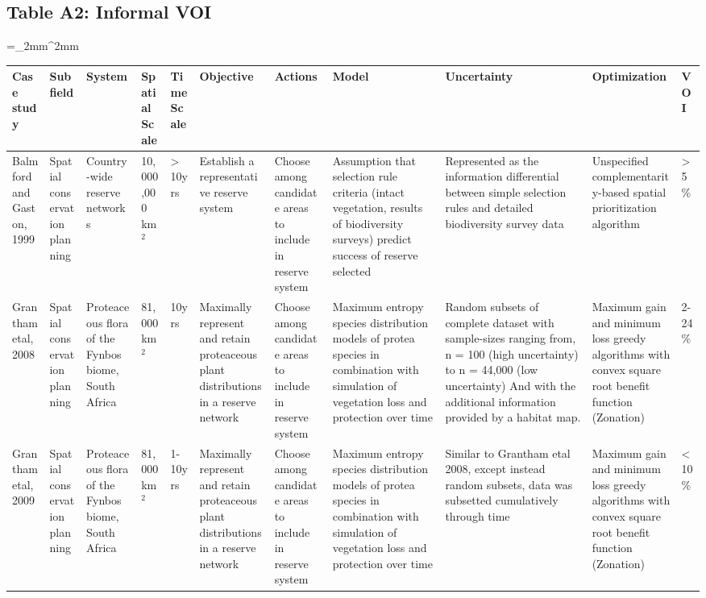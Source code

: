 \begin{landscape}
\subsection*{Table A2: Informal VOI}
\bgroup
\linespread{1}\scriptsize
\extrarowsep=_2mm^2mm
\begin{longtabu} to 230mm {|X[1,l] X[1,l] X[1,l] X[1,l] X[.8,l] X[1,l] X[1,l] X[1,l] X[1,l] X[1,l] X[.5,l]|} \hline 
Case study & Subfield & System & Spatial Scale & Time Scale & Objective & Actions & Model & Uncertainty & Optimization & VOI \\ \hline
Balmford and Gaston, 1999 & Spatial conservation planning & Country-wide reserve networks & 10,000,000 km$^2$ & > 10yrs & Establish a representative reserve system & Choose among candidate areas to include in reserve system & Assumption that selection rule criteria (intact vegetation, results of biodiversity surveys) predict success of reserve selected  & Represented as the information differential between simple selection rules and detailed biodiversity survey data & Unspecified complementarity-based spatial prioritization algorithm & >5\% \\ 
Grantham etal, 2008 & Spatial conservation planning & Proteaceous flora of the Fynbos biome, South Africa  & 81,000 km$^2$ & 10yrs & Maximally represent and retain proteaceous plant distributions in a reserve network & Choose among candidate areas to include in reserve system & Maximum entropy species distribution models of protea species in combination with simulation of vegetation loss and protection over time & Random subsets of complete dataset with sample-sizes ranging from, n = 100 (high uncertainty) to n = 44,000 (low uncertainty) And with the additional information provided by a habitat map. & Maximum gain and minimum loss greedy algorithms with convex square root benefit function (Zonation) & 2-24\% \\ 
Grantham etal, 2009 & Spatial conservation planning & Proteaceous flora of the Fynbos biome, South Africa  & 81,000 km$^2$ & 1-10yrs & Maximally represent and retain proteaceous plant distributions in a reserve network & Choose among candidate areas to include in reserve system & Maximum entropy species distribution models of protea species in combination with simulation of vegetation loss and protection over time & Similar to Grantham etal 2008, except instead random subsets, data was subsetted cumulatively through time & Maximum gain and minimum loss greedy algorithms with convex square root benefit function (Zonation) & <10\% \\ 

\end{longtabu}
\end{landscape}
